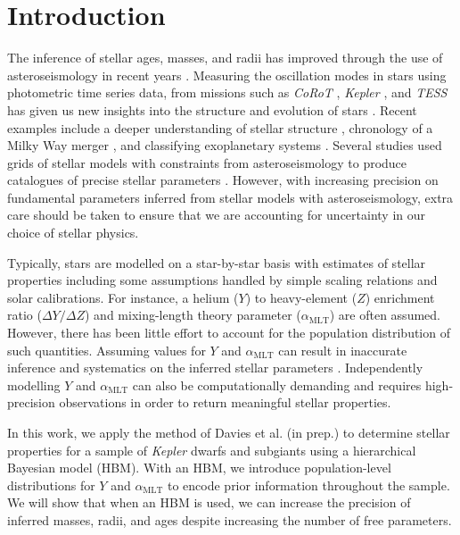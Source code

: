 \documentclass[a4paper,fleqn,usenatbib]{mnras}
\newcommand{\mlt}{\ensuremath{{\alpha_\mathrm{MLT}}}}
\begin{document}
\section{Introduction}


The inference of stellar ages, masses, and radii has improved through the use of asteroseismology in recent years \citep[e.g. see the review by][]{Chaplin.Miglio2013}. Measuring the oscillation modes in stars using photometric time series data, from missions such as \emph{CoRoT} \citep{Baglin.Auvergne.ea2006}, \emph{Kepler} \citep{Borucki.Koch.ea2010}, and \emph{TESS} \citep{Ricker.Winn.ea2015} has given us new insights into the structure and evolution of stars \citep{Garcia.Ballot2019}. Recent examples include a deeper understanding of stellar structure \citep{Verma.Raodeo.ea2017}, chronology of a Milky Way merger \citep{Chaplin.Serenelli.ea2020}, and classifying exoplanetary systems \citep{Huber.Chaplin.ea2019, Tayar.Claytor.ea2020}. Several studies used grids of stellar models with constraints from asteroseismology to produce catalogues of precise stellar parameters \citep{Pinsonneault.Elsworth.ea2014, SilvaAguirre.Lund.ea2017}. However, with increasing precision on fundamental parameters inferred from stellar models with asteroseismology, extra care should be taken to ensure that we are accounting for uncertainty in our choice of stellar physics.

Typically, stars are modelled on a star-by-star basis with estimates of stellar properties including some assumptions handled by simple scaling relations and solar calibrations. %
For instance, a helium ($Y$) to heavy-element ($Z$) enrichment ratio ($\Delta Y / \Delta Z$) and mixing-length theory parameter ($\mlt$) are often assumed. However, there has been little effort to account for the population distribution of such quantities. Assuming values for $Y$ and $\mlt$ can result in inaccurate inference and systematics on the inferred stellar parameters \citep{Valle.DellOmodarme.ea2015}. Independently modelling $Y$ and $\mlt$ can also be computationally demanding and requires high-precision observations in order to return meaningful stellar properties.

In this work, we apply the method of Davies et al. (in prep.) to determine stellar properties for a sample of \emph{Kepler} dwarfs and subgiants using a hierarchical Bayesian model (HBM). With an HBM, we introduce population-level distributions for $Y$ and $\mlt$ to encode prior information throughout the sample. We will show that when an HBM is used, we can increase the precision of inferred masses, radii, and ages despite increasing the number of free parameters.
\end{document}
